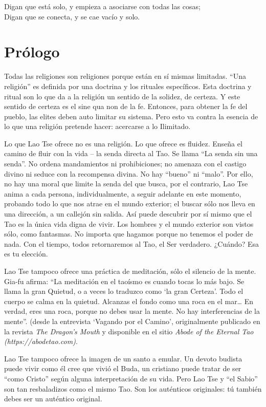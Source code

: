 \documentclass[hidelinks]{memoir}
\begin{document}
	Digan que está solo, y empieza a asociarse con todas las cosas;\\
	Digan que se conecta, y se cae vacío y solo.
	
	\chapter*{Prólogo}
	
	Todas las religiones son religiones porque están en sí mismas limitadas.
	``Una religión'' es definida por una doctrina y los rituales
	específicos. Esta doctrina y ritual son lo que da a la religión un
	sentido de la solidez, de certeza. Y este sentido de certeza es el sine
	qua non de la fe. Entonces, para obtener la fe del pueblo, las elites
	deben auto limitar su sistema. Pero esto va contra la esencia de lo que
	una religión pretende hacer: acercarse a lo Ilimitado.
	
	Lo que Lao Tse ofrece no es una religión. Lo que ofrece es fluidez.
	Enseña el camino de fluir con la vida -- la senda directa al Tao. Se
	llama ``La senda sin una senda''. No ordena mandamientos ni
	prohibiciones; no amenaza con el castigo divino ni seduce con la
	recompensa divina. No hay ``bueno'' ni ``malo''. Por ello, no hay una
	moral que limite la senda del que busca, por el contrario, Lao Tse anima
	a cada persona, individualmente, a seguir adelante en este momento,
	probando todo lo que nos atrae en el mundo exterior; el buscar sólo nos
	lleva en una dirección, a un callejón sin salida. Así puede descubrir
	por sí mismo que el Tao es la única vida digna de vivir. Los hombres y
	el mundo exterior son vistos sólo, como fantasmas. No importa que
	hagamos porque no tenemos el poder de nada. Con el tiempo, todos
	retornaremos al Tao, el Ser verdadero. ¿Cuándo? Esa es tu elección.
	
	Lao Tse tampoco ofrece una práctica de meditación, sólo el silencio de
	la mente. Gia-fu afirma: ``La meditación en el taoísmo es cuando tocas
	lo más bajo. Se llama la gran Quietud, o a veces lo traduzco como `la
	gran Certeza'. Todo el cuerpo se calma en la quietud. Alcanzas el fondo
	como una roca en el mar\ldots{} En verdad, eres una roca, porque no
	debes usar la mente. No hay interferencias de la mente''. (desde la
	entrevista `Vagando por el Camino', originalmente publicado en la
	revista \textit{The Dragon's Mouth} y disponible en el sitio \textit{Abode
		of the Eternal Tao (https://abodetao.com)}.
	
	Lao Tse tampoco ofrece la imagen de un santo a emular. Un devoto budista
	puede vivir como él cree que vivió el Buda, un cristiano puede tratar de
	ser ``como Cristo'' según alguna interpretación de su vida. Pero Lao Tse
	y ``el Sabio'' son tan resbaladizos como el mismo Tao. Son los
	auténticos originales: tú también debes ser un auténtico original.
	
\end{document}
